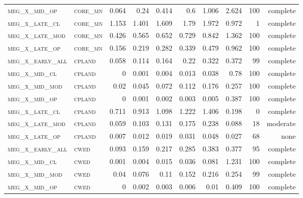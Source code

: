 \begin{landscape}
\begin{center}
\begin{footnotesize}
\begin{longtable}{llrrrrr|rrr}
\textsc{meg\_x\_mid\_op   } & \textsc{core\_mn  }    & 0.064    & 0.24     & 0.414    & 0.6      & 1.006    & 2.624    & 100 & complete \\
\textsc{meg\_x\_late\_cl  } & \textsc{core\_mn  }    & 1.153    & 1.401    & 1.609    & 1.79     & 1.972    & 0.972    & 1   & complete \\
\textsc{meg\_x\_late\_mod } & \textsc{core\_mn  }    & 0.426    & 0.565    & 0.652    & 0.729    & 0.842    & 1.362    & 100 & complete \\
\textsc{meg\_x\_late\_op  } & \textsc{core\_mn  }    & 0.156    & 0.219    & 0.282    & 0.339    & 0.479    & 0.962    & 100 & complete \\
\textsc{meg\_x\_early\_all} & \textsc{cpland    }    & 0.058    & 0.114    & 0.164    & 0.22     & 0.322    & 0.372    & 99  & complete \\
\textsc{meg\_x\_mid\_cl   } & \textsc{cpland    }    & 0        & 0.001    & 0.004    & 0.013    & 0.038    & 0.78     & 100 & complete \\
\textsc{meg\_x\_mid\_mod  } & \textsc{cpland    }    & 0.02     & 0.045    & 0.072    & 0.112    & 0.176    & 0.257    & 100 & complete \\
\textsc{meg\_x\_mid\_op   } & \textsc{cpland    }    & 0        & 0.001    & 0.002    & 0.003    & 0.005    & 0.387    & 100 & complete \\
\textsc{meg\_x\_late\_cl  } & \textsc{cpland    }    & 0.711    & 0.913    & 1.098    & 1.222    & 1.406    & 0.198    & 0   & complete \\
\textsc{meg\_x\_late\_mod } & \textsc{cpland    }    & 0.059    & 0.103    & 0.131    & 0.175    & 0.238    & 0.088    & 18  & moderate \\
\textsc{meg\_x\_late\_op  } & \textsc{cpland    }    & 0.007    & 0.012    & 0.019    & 0.031    & 0.048    & 0.027    & 68  & none     \\
\textsc{meg\_x\_early\_all} & \textsc{cwed      }    & 0.093    & 0.159    & 0.217    & 0.285    & 0.383    & 0.377    & 95  & complete \\
\textsc{meg\_x\_mid\_cl   } & \textsc{cwed      }    & 0.001    & 0.004    & 0.015    & 0.036    & 0.081    & 1.231    & 100 & complete \\
\textsc{meg\_x\_mid\_mod  } & \textsc{cwed      }    & 0.04     & 0.076    & 0.11     & 0.152    & 0.216    & 0.254    & 99  & complete \\
\textsc{meg\_x\_mid\_op   } & \textsc{cwed      }    & 0        & 0.002    & 0.003    & 0.006    & 0.01     & 0.409    & 100 & complete \\

\end{longtable}
\end{footnotesize}
\end{center}
\end{landscape}
